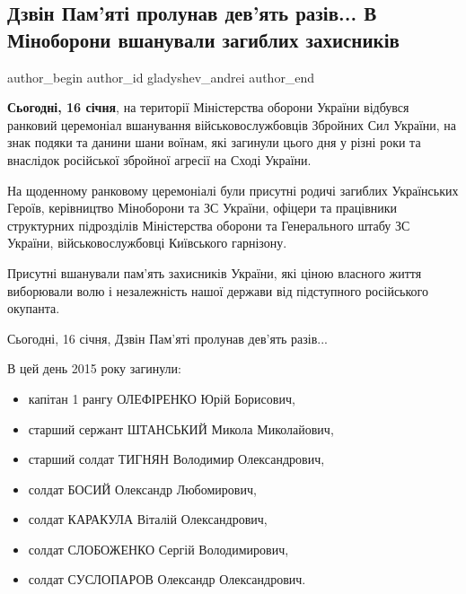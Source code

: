  
 
 
 
 
\subsection{Дзвін Пам’яті пролунав дев’ять разів... В Міноборони вшанували загиблих захисників}
\ifcmt
  author_begin
   author_id gladyshev_andrei
  author_end
\fi

\textbf{Сьогодні, 16 січня}, на території Міністерства оборони України відбувся ранковий
церемоніал вшанування військовослужбовців Збройних Сил України, на знак подяки
та данини шани воїнам, які загинули цього дня у різні роки та внаслідок
російської збройної агресії на Сході України.

На щоденному ранковому церемоніалі були присутні родичі загиблих Українських
Героїв, керівництво Міноборони та ЗС України, офіцери та працівники структурних
підрозділів Міністерства оборони та Генерального штабу ЗС України,
військовослужбовці Київського гарнізону.

Присутні вшанували пам’ять захисників України, які ціною власного життя
виборювали волю і незалежність нашої держави від підступного російського
окупанта.

Сьогодні, 16 січня, Дзвін Пам’яті пролунав дев’ять разів...

В цей день 2015 року загинули:

\begin{itemize}
  \item капітан 1 рангу ОЛЕФІРЕНКО Юрій Борисович,
  \item старший сержант ШТАНСЬКИЙ Микола Миколайович,
  \item старший солдат ТИГНЯН Володимир Олександрович,
  \item солдат БОСИЙ Олександр Любомирович,
  \item солдат КАРАКУЛА Віталій Олександрович,
  \item солдат СЛОБОЖЕНКО Сергій Володимирович,
  \item солдат СУСЛОПАРОВ Олександр Олександрович.
\end{itemize}

